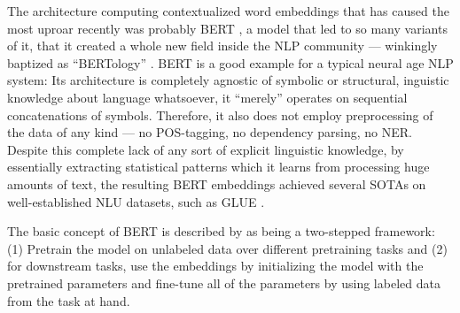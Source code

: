 The architecture computing contextualized word embeddings that has caused the most uproar
recently was probably BERT \cite{devlin2018bert}, a model that led to so many variants of
it, that it created a whole new field inside the NLP community --- winkingly baptized as
``BERTology'' \cite{rogers2020primer}. BERT is a good example for a typical neural age
NLP system: Its architecture is completely agnostic of symbolic or structural, inguistic
knowledge about language whatsoever, it ``merely'' operates on sequential concatenations
of symbols. Therefore, it also does not employ preprocessing of the data of any kind ---
no POS-tagging, no dependency parsing, no NER. Despite this complete lack of any sort
of explicit linguistic knowledge, by essentially extracting statistical patterns which
it learns from processing huge amounts of text, the resulting BERT embeddings achieved
several SOTAs on well-established NLU datasets, such as GLUE \cite{wang2018glue}.


The basic concept of BERT is described by \citeauthor{devlin2018bert} as
being a two-stepped framework: (1) Pretrain the model on unlabeled data over
different pretraining tasks and (2) for downstream tasks, use the embeddings by initializing
the model with the pretrained parameters and fine-tune all of the parameters
by using labeled data from the task at hand.

